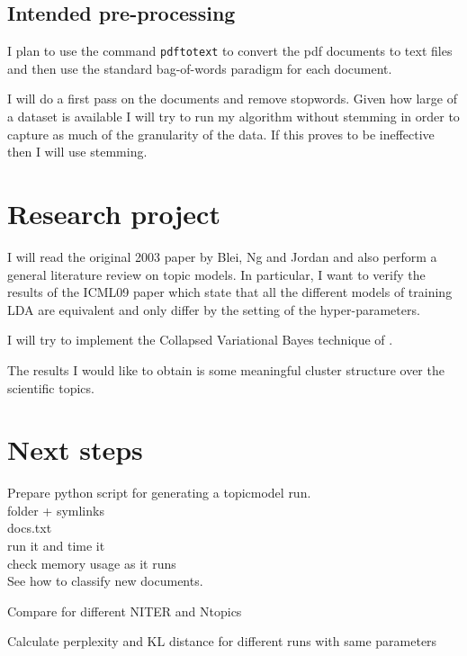 \documentclass[11pt]{article}
\begin{document}
	
	\subsection{Intended pre-processing}
	
		I plan to use the command \texttt{pdftotext} to convert the pdf documents to text files and
		then use the standard bag-of-words paradigm for each document.
		
		I will do a first pass on the documents and remove stopwords.		
		Given how large of a dataset is available I will try to run my algorithm without stemming in order
		to capture as much of the granularity of the data.
		If this proves to be ineffective then I will use stemming.
		  


	
\section{Research project}

	I will read the original 2003 paper by Blei, Ng and Jordan \cite{Blei2003} and also perform a general literature
	review on topic models.
	In particular, I want to verify the results of the ICML09 paper \cite{Teh2009} which state that all the different 
	models of training
	LDA are equivalent and only differ by the setting of the hyper-parameters.
	
	I will try to implement the Collapsed Variational Bayes technique of \cite{Teh2007}.
	
	The results I would like to obtain is some meaningful cluster structure over the scientific topics.
	
	
\section{Next steps}
	
    Prepare python script for generating a topicmodel run. \\
    folder + symlinks\\
    docs.txt \\
    run it and time it \\ 
    check memory usage as it runs \\


    See how to classify new documents.


    Compare for different NITER and Ntopics


    Calculate perplexity and KL distance for different runs with same parameters
\end{document}
